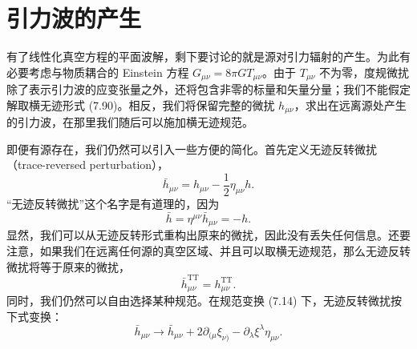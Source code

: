 
\section{引力波的产生}

有了线性化真空方程的平面波解，剩下要讨论的就是源对引力辐射的产生。为此有必要考虑与物质耦合的 Einstein 方程 $G_{\mu\nu} = 8\pi G T_{\mu\nu}$。由于 $T_{\mu\nu}$ 不为零，度规微扰除了表示引力波的应变张量之外，还将包含非零的标量和矢量分量；我们不能假定解取横无迹形式 (7.90)。相反，我们将保留完整的微扰 $h_{\mu\nu}$，求出在远离源处产生的引力波，在那里我们随后可以施加横无迹规范。

即便有源存在，我们仍然可以引入一些方便的简化。首先定义无迹反转微扰（trace-reversed perturbation），
\begin{equation*}
\bar{h}_{\mu\nu} = h_{\mu\nu} - \frac{1}{2}\eta_{\mu\nu}h.
\tag{7.117}
\end{equation*}
“无迹反转微扰”这个名字是有道理的，因为
\begin{equation*}
\bar{h} = \eta^{\mu\nu}\bar{h}_{\mu\nu} = -h.
\tag{7.118}
\end{equation*}
显然，我们可以从无迹反转形式重构出原来的微扰，因此没有丢失任何信息。还要注意，如果我们在远离任何源的真空区域、并且可以取横无迹规范，那么无迹反转微扰将等于原来的微扰，
\begin{equation*}
\bar{h}^{\mathrm{TT}}_{\mu\nu} = h^{\mathrm{TT}}_{\mu\nu}.
\tag{7.119}
\end{equation*}
同时，我们仍然可以自由选择某种规范。在规范变换 (7.14) 下，无迹反转微扰按下式变换：
\begin{equation*}
\bar{h}_{\mu\nu} \rightarrow \bar{h}_{\mu\nu} + 2\partial_{(\mu}\xi_{\nu)} - \partial_\lambda\xi^{\lambda}\eta_{\mu\nu}.
\tag{7.120}
\end{equation*}


